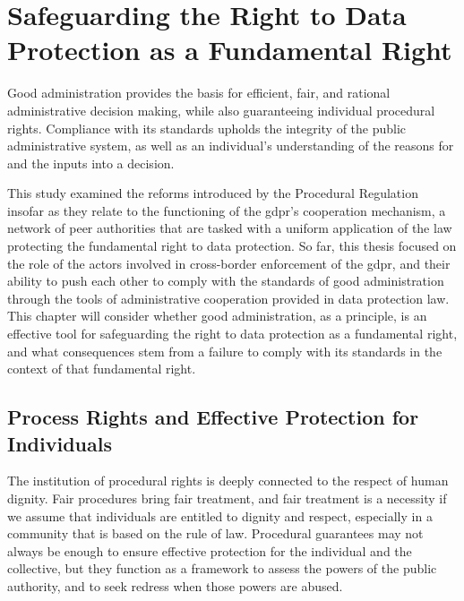\section{Safeguarding the Right to Data Protection as a Fundamental Right}
\label{sec:ch6-safeguarding-fundamental-right}

Good administration provides the basis for efficient, fair, and rational administrative decision making, while also guaranteeing individual procedural rights.\autocite[213]{hofmannDemkovaPrinciplesProcJustice}
Compliance with its standards upholds the integrity of the public administrative system, as well as an individual's understanding of the reasons for and the inputs into a decision.\autocite[213]{hofmannDemkovaPrinciplesProcJustice}

This study examined the reforms introduced by the Procedural Regulation insofar as they relate to the functioning of the \gls{gdpr}'s cooperation mechanism, a network of peer authorities that are tasked with a uniform application of the law protecting the fundamental right to data protection.
So far, this thesis focused on the role of the actors involved in cross-border enforcement of the \gls{gdpr}, and their ability to push each other to comply with the standards of good administration through the tools of administrative cooperation provided in data protection law.
This chapter will consider whether good administration, as a principle, is an effective tool for safeguarding the right to data protection as a fundamental right, and what consequences stem from a failure to comply with its standards in the context of that fundamental right.

\subsection{Process Rights and Effective Protection for Individuals}
\label{sec:ch6-process-rights}

The institution of procedural rights is deeply connected to the respect of human dignity.\autocite[75--76]{galliganProceduralFairness1997}
Fair procedures bring fair treatment, and fair treatment is a necessity if we assume that individuals are entitled to dignity and respect, especially in a community that is based on the rule of law.\autocites[75--76]{galliganProceduralFairness1997}[338--339]{nehlGoodAdminProceduralRight2009}
Procedural guarantees may not always be enough to ensure effective protection for the individual and the collective, but they function as a framework to assess the powers of the public authority, and to seek redress when those powers are abused.\autocite[76--77]{galliganProceduralFairness1997}

